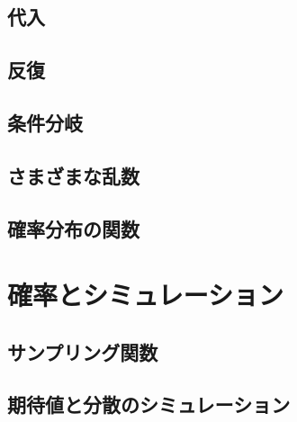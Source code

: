 \documentclass[
  a4paper,
]{ltjsbook}
\begin{document}
\hypertarget{ux4ee3ux5165}{%
\section{代入}\label{ux4ee3ux5165}}

\hypertarget{ux53cdux5fa9}{%
\section{反復}\label{ux53cdux5fa9}}

\hypertarget{ux6761ux4ef6ux5206ux5c90}{%
\section{条件分岐}\label{ux6761ux4ef6ux5206ux5c90}}

\hypertarget{ux3055ux307eux3056ux307eux306aux4e71ux6570}{%
\section{さまざまな乱数}\label{ux3055ux307eux3056ux307eux306aux4e71ux6570}}

\hypertarget{ux78baux7387ux5206ux5e03ux306eux95a2ux6570}{%
\section{確率分布の関数}\label{ux78baux7387ux5206ux5e03ux306eux95a2ux6570}}


\hypertarget{ux78baux7387ux3068ux30b7ux30dfux30e5ux30ecux30fcux30b7ux30e7ux30f3}{%
\chapter{確率とシミュレーション}\label{ux78baux7387ux3068ux30b7ux30dfux30e5ux30ecux30fcux30b7ux30e7ux30f3}}

\hypertarget{ux30b5ux30f3ux30d7ux30eaux30f3ux30b0ux95a2ux6570}{%
\section{サンプリング関数}\label{ux30b5ux30f3ux30d7ux30eaux30f3ux30b0ux95a2ux6570}}

\hypertarget{ux671fux5f85ux5024ux3068ux5206ux6563ux306eux30b7ux30dfux30e5ux30ecux30fcux30b7ux30e7ux30f3}{%
\section{期待値と分散のシミュレーション}\label{ux671fux5f85ux5024ux3068ux5206ux6563ux306eux30b7ux30dfux30e5ux30ecux30fcux30b7ux30e7ux30f3}}
\end{document}
